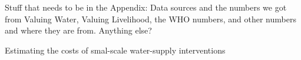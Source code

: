 Stuff that needs to be in the Appendix: 
Data sources and the numbers we got from Valuing Water, Valuing Livelihood, the WHO numbers, and other numbers and where they are from.
Anything else?
\begin{center}
Estimating the costs of smal-scale water-supply interventions
\end{center}

